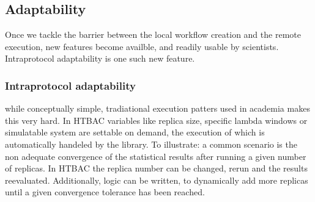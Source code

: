 \subsection{Adaptability}

Once we tackle the barrier between the local workflow creation and the remote
execution, new features become availble, and readily usable by scientists.
Intraprotocol adaptability is one such new feature.

\subsubsection{Intraprotocol adaptability}

while conceptually simple, tradiational execution patters used in academia
makes this very hard. In HTBAC variables like replica size, specific lambda
windows or simulatable system are settable on demand, the execution of which
is automatically handeled by the library. To illustrate: a common scenario is
the non adequate convergence of the statistical results after running a given
number of replicas. In HTBAC the replica number can be changed, rerun and the
results reevaluated. Additionally, logic can be written, to dynamically add
more replicas until a given convergence tolerance has been reached.